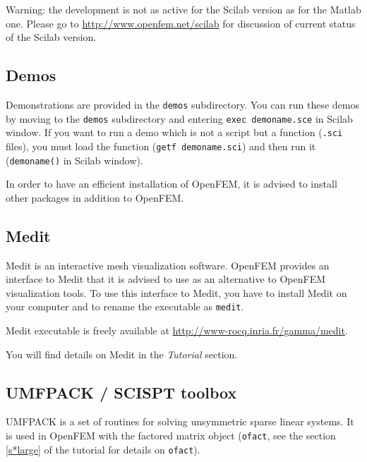 
Warning: the development is not as active for the Scilab version as
for the Matlab one. Please go to \url{http://www.openfem.net/scilab}
for discussion of current status of the Scilab version.



\subsection{Demos}

Demonstrations are provided in the {\tt demos} subdirectory. You can run these demos by moving to the {\tt demos} subdirectory and entering {\tt exec demoname.sce} in Scilab window. If you want to run a demo which is not a script but a function ({\tt .sci} files), you must load the function ({\tt getf demoname.sci}) and then run it ({\tt demoname()} in Scilab window). 



In order to have an efficient installation of OpenFEM, it is advised to install other packages in addition to OpenFEM. 

\subsection{Medit}

Medit is an interactive mesh visualization software. OpenFEM provides an interface to Medit that it is advised to use as an alternative to OpenFEM visualization tools. To use this interface to Medit, you have to install Medit on your computer and to rename the executable as {\tt medit}. 

Medit executable is freely available at \href{http://www-rocq.inria.fr/gamma/medit}{http://www-rocq.inria.fr/gamma/medit}.

You will find details on Medit in the {\sl Tutorial} section. 

\subsection{UMFPACK / SCISPT toolbox}

UMFPACK is a set of routines for solving unsymmetric sparse linear systems. It is used in OpenFEM with the factored matrix object ({\tt ofact}, see the section \ref{s*large} of the tutorial for details on {\tt ofact}).

